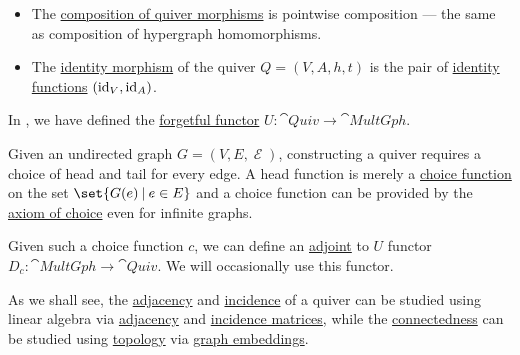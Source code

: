 \begin{definition}
\begin{itemize}
    \item The \hyperref[def:category/composition]{composition of quiver morphisms} is pointwise composition --- the same as composition of hypergraph homomorphisms.

    \item The \hyperref[def:category/identity]{identity morphism} of the quiver \( Q = (V, A, h, t) \) is the pair of \hyperref[def:multi_valued_function/identity]{identity functions} \( (\operatorname{id}_V, \operatorname{id}_A) \).
  \end{itemize}
\end{definition}

\begin{definition}\label{def:multigraph_adjunction}
  In , we have defined the \hyperref[rem:forgetful_functor]{forgetful functor} \( U: \hyperref[def:category_of_small_quivers]{\cat{Quiv}} \to \hyperref[def:undirected_multigraph]{\cat{MultGph}} \).

  Given an undirected graph \( G = (V, E, \mscrE) \), constructing a quiver requires a choice of head and tail for every edge. A head function is merely a \hyperref[def:choice_function]{choice function} on the set \( \set{ G(e) \given e \in E } \) and a choice function can be provided by the \hyperref[def:zfc/choice]{axiom of choice} even for infinite graphs.

  Given such a choice function \( c \), we can define an \hyperref[rem:forgetful_functor]{adjoint} to \( U \) functor \( D_c: \cat{MultGph} \to \cat{Quiv} \). We will occasionally use this functor.
\end{definition}

\begin{remark}\label{rem:graphs_linear_algebra_and_topology}
  As we shall see, the \hyperref[def:graph/adjacent_vertices]{adjacency} and \hyperref[def:graph/incidence]{incidence} of a quiver can be studied using linear algebra via \hyperref[def:graph_adjacency_matrix]{adjacency} and \hyperref[def:hypergraph_incidence_matrix]{incidence matrices}, while the \hyperref[def:quiver_connectedness]{connectedness} can be studied using \hyperref[def:quiver_connectedness]{topology} via \hyperref[def:quiver_geometric_relization/embedding]{graph embeddings}.
\end{remark}

